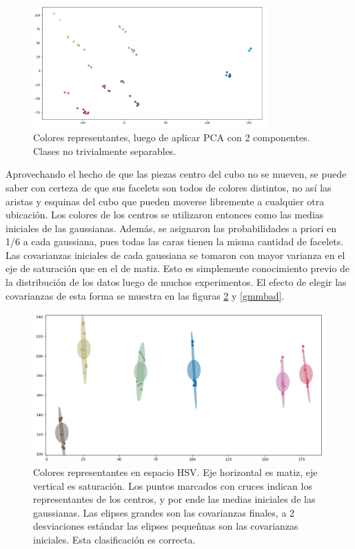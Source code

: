 \begin{figure}[h!]
	\centering
	\includegraphics[width=0.8\textwidth]{figures/rgb_pca}
	\caption[Colores representantes, luego de aplicar PCA con 2 componentes]{Colores representantes, luego de aplicar PCA con 2 componentes. Clases no trivialmente separables.}
	\label{rgb3d}
\end{figure}

Aprovechando el hecho de que las piezas centro del cubo no se mueven, se puede saber con certeza de que sus facelets son todos de colores distintos, no así las aristas y esquinas del cubo que pueden moverse libremente a cualquier otra ubicación. Los colores de los centros se utilizaron entonces como las medias iniciales de las gaussianas. Además, se asignaron las probabilidades a priori en 1/6 a cada gaussiana, pues todas las caras tienen la misma cantidad de facelets. Las covarianzas iniciales de cada gaussiana se tomaron con mayor varianza en el eje de saturación que en el de matiz. Esto es simplemente conocimiento previo de la distribución de los datos luego de muchos experimentos. El efecto de elegir las covarianzas de esta forma se muestra en las figuras \ref{gmmgood} y \ref{gmmbad}.

\begin{figure}[h!]
	\centering
	\includegraphics[width=\textwidth]{figures/gmm}
	\caption[Colores representantes en espacio HSV.]{Colores representantes en espacio HSV. Eje horizontal es matiz, eje vertical es saturación. Los puntos marcados con cruces indican los representantes de los centros, y por ende las medias iniciales de las gaussianas. Las elipses grandes son las covarianzas finales, a 2 desviaciones estándar las elipses pequeñnas son las covarianzas iniciales. Esta clasificación es correcta.}
	\label{gmmgood}
\end{figure}

